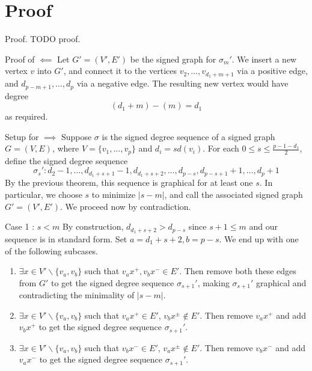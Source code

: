 \section{Proof}

\begin{frame}{Proof.}
	TODO proof.
\end{frame}

\begin{frame}{Proof of $\impliedby$}
	Let $G' = (V',E')$ be the signed graph for $\sigma_m'$. We insert a new vertex $v$ into $G'$, and connect it to the vertices $v_2,\dots,v_{d_1+m+1}$ via a positive edge, and $d_{p-m+1},\dots,d_p$ via a negative edge. The resulting new vertex would have degree
	\begin{equation*}
		(d_1+m)-(m) = d_1
	\end{equation*}
	as required.
\end{frame}

\begin{frame}{Setup for $\implies$}
	Suppose $\sigma$ is the signed degree sequence of a signed graph $G = (V,E)$, where $V = \{v_1,\dots,v_p\}$ and $d_i = sd(v_i)$. For each $0 \leq s \leq \frac{p-1-d_1}{2}$, define the signed degree sequence
	\begin{equation*}
		\sigma_s' : d_2-1,\dots,d_{d_1+s+1}-1,d_{d_1+s+2},\dots,d_{p-s},d_{p-s+1}+1,\dots,d_p+1
	\end{equation*}
	By the previous theorem, this sequence is graphical for at least one $s$. In particular, we choose $s$ to minimize $|s-m|$, and call the associated signed graph $G' = (V',E')$. We proceed now by contradiction.
\end{frame}

\begin{frame}{Case 1 : $s < m$}
	By construction, $d_{d_1+s+2} > d_{p-s}$ since $s+1 \leq m$ and our sequence is in standard form. Set $a = d_1+s+2, b = p - s$. We end up with one of the following subcases.
	\begin{enumerate}
		\item $\exists x \in V'\backslash\{v_a,v_b\}$ such that $v_ax^{+}, v_bx^{-} \in E'$. Then remove both these edges from $G'$ to get the signed degree sequence $\sigma_{s+1}'$, making $\sigma_{s+1}'$ graphical and contradicting the minimality of $|s - m|$.
		\item $\exists x \in V'\backslash\{v_a,v_b\}$ such that $v_ax^{+} \in E'$, $v_bx^{\pm} \notin E'$. Then remove $v_ax^{+}$ and add $v_bx^{+}$ to get the signed degree sequence $\sigma_{s+1}'$.
		\item $\exists x \in V'\backslash\{v_a,v_b\}$ such that $v_bx^{-} \in E'$, $v_ax^{\pm} \notin E'$. Then remove $v_bx^{-}$ and add $v_ax^{-}$ to get the signed degree sequence $\sigma_{s+1}'$.
	\end{enumerate}
\end{frame}

